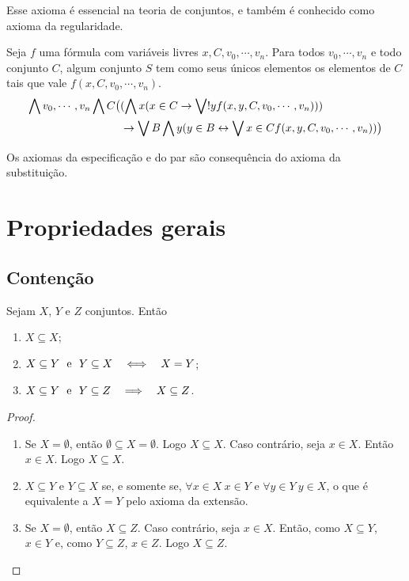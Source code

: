 Esse axioma é essencial na teoria de conjuntos, e também é conhecido como axioma da regularidade.

\begin{axiom}
Seja $f$ uma fórmula com variáveis livres $x,C,v_0,\cdots,v_n$. Para todos $v_0,\cdots,v_n$ e todo conjunto $C$, algum conjunto $S$ tem como seus únicos elementos os elementos de $C$ tais que vale $f(x,C,v_0,\cdots,v_n)$.
	\begin{align*}
		\bigwedge\nolimits v_0,\cdots,v_n \bigwedge\nolimits C \big( & (\bigwedge\nolimits x (x \in C \rightarrow \bigvee\nolimits! y f(x,y,C,v_0,\cdots,v_n))) \\
			&\rightarrow \bigvee\nolimits B \bigwedge\nolimits y (y \in B \leftrightarrow \bigvee\nolimits x \in C f(x,y,C,v_0,\cdots,v_n))\big)
		\end{align*}
\end{axiom}

Os axiomas da especificação e do par são consequência do axioma da substituição.

\section*{Propriedades gerais}

\subsection*{Contenção}

\begin{proposition}
Sejam $X$, $Y$ e $Z$ conjuntos. Então
	\begin{enumerate}
	\item $X \subseteq X$;
	\item $X \subseteq Y \text{\ \ e\ \ } Y \subseteq X \quad \Longleftrightarrow \quad X=Y$;
	\item $X \subseteq Y \text{\ \ e\ \ } Y \subseteq Z \quad \Longrightarrow \quad X \subseteq Z$.
	\end{enumerate}
\end{proposition}
\begin{proof}
	\begin{enumerate}
	\item Se $X=\emptyset$, então $\emptyset \subseteq X = \emptyset$. Logo $X \subseteq X$. Caso contrário, seja $x \in X$. Então $x \in X$. Logo $X \subseteq X$.
	\item $X \subseteq Y$ e $Y \subseteq X$ se, e somente se, $\forall x \in X \ x \in Y$ e $\forall y \in Y \ y \in X$, o que é equivalente a $X=Y$ pelo axioma da extensão.
	\item Se $X=\emptyset$, então $X \subseteq Z$. Caso contrário, seja $x \in X$. Então, como $X \subseteq Y$, $x \in Y$ e, como $Y \subseteq Z$, $x \in Z$. Logo $X \subseteq Z$.
	\end{enumerate}
\end{proof}

